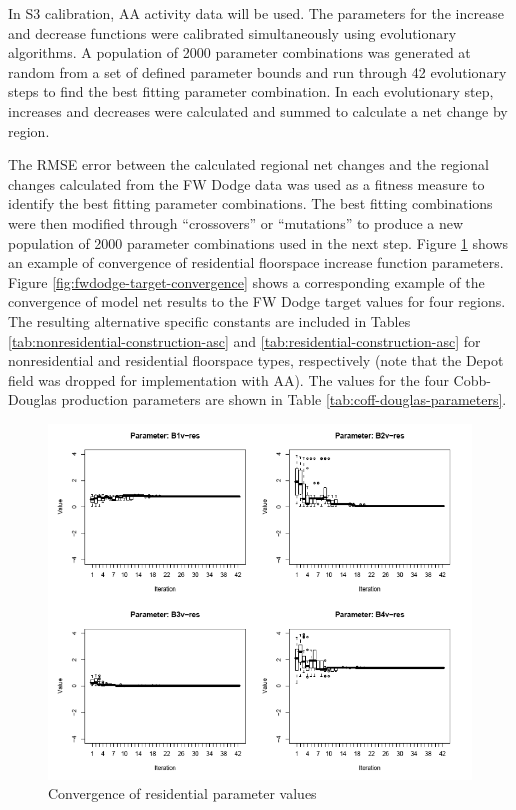 In S3 calibration, AA activity data will be used. The parameters for the increase and decrease functions were calibrated simultaneously using evolutionary algorithms. A population of 2000 parameter combinations was generated at random from a set of defined parameter bounds and run through 42 evolutionary steps to find the best fitting parameter combination. In each evolutionary step, increases and decreases were calculated and summed to calculate a net change by region.

The RMSE error between the calculated regional net changes and the regional changes calculated from the FW Dodge data was used as a fitness measure to identify the best fitting parameter combinations. The best fitting combinations were then modified through ``crossovers'' or ``mutations'' to produce a new population of 2000 parameter combinations used in the next step. Figure \ref{fig:residential-parameter-convergence} shows an example of convergence of residential floorspace increase function parameters. Figure \ref{fig:fwdodge-target-convergence} shows a corresponding example of the convergence of model net results to the FW Dodge target values for four regions. The resulting alternative specific constants are included in Tables \ref{tab:nonresidential-construction-asc} and \ref{tab:residential-construction-asc} for nonresidential and residential floorspace types, respectively (note that the Depot field was dropped for implementation with AA). The values for the four Cobb-Douglas production parameters are shown in Table \ref{tab:coff-douglas-parameters}.


\begin{figure}[!t]
\centering
\includegraphics[width=6in]{ald/residential-parameter-convergence}
\caption{Convergence of residential parameter values}\label{fig:residential-parameter-convergence}
\end{figure}

